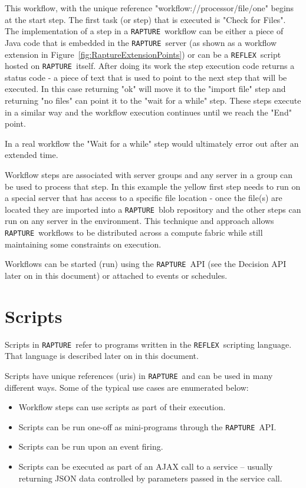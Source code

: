 \documentclass[12pt,twoside,a4paper]{book}
\newcommand{\Rapture}{\Verb+RAPTURE+~}
\newcommand{\Reflex}{\Verb+REFLEX+~}
\begin{document}
This workflow, with the unique reference "workflow://processor/file/one" begins at the start step. The first
task (or step) that is executed is "Check for Files". The implementation of a step in a \Rapture workflow can be either
a piece of Java code that is embedded in the \Rapture server (as shown as a workflow extension in Figure~\vref{fig:RaptureExtensionPoints})
or can be a \Reflex script hosted on \Rapture itself. After doing its work the step execution code returns a status code - a piece of text
that is used to point to the next step that will be executed. In this case returning "ok" will move it to the "import file" step and returning
"no files" can point it to the "wait for a while" step. These steps execute in a similar way and the workflow execution continues until we
reach the "End" point.

In a real workflow the "Wait for a while" step would ultimately error out after an extended time.

Workflow steps are associated with server groups and any server in a group can be used to process that step. In this example the yellow first step
needs to run on a special server that has access to a specific file location - once the file(s) are located they are imported into a \Rapture blob repository
and the other steps can run on any server in the environment. This technique and approach allows \Rapture workflows to be distributed across a compute fabric while
still maintaining some constraints on execution.

Workflows can be started (run) using the \Rapture API (see the Decision API later on in this document) or attached to events or schedules.

\section{Scripts}

Scripts in \Rapture refer to programs written in the \Reflex scripting language. That language is described later on in this document.

Scripts have unique references (uris) in \Rapture and can be used in many different ways. Some of the typical use cases are enumerated below:

\begin{itemize}
	\item{Workflow steps can use scripts as part of their execution.}
	\item{Scripts can be run one-off as mini-programs through the \Rapture API.}
	\item{Scripts can be run upon an event firing.}
	\item{Scripts can be executed as part of an AJAX call to a service -- usually returning JSON data controlled by parameters passed in the service call.}
\end{itemize}
\end{document}
